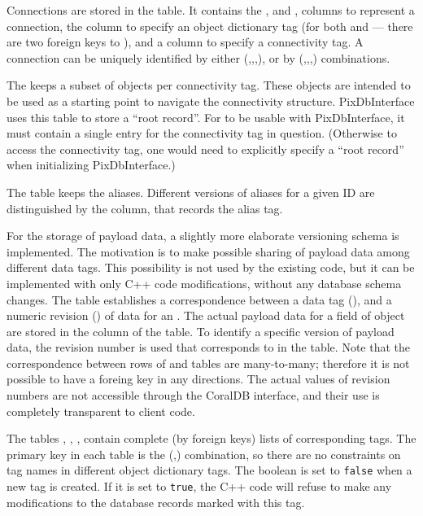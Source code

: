 Connections are stored in the  table.  It
contains the , and , columns
to represent a connection, the  column to specify an object
dictionary tag (for both  and  --- there are two
foreign keys to ), and a  column to
specify a connectivity tag.  A connection can be uniquely identified
by either (,,,), or by
(,,,) combinations.

The  keeps a subset of objects per
connectivity tag.  These objects are intended to be used as a starting
point to navigate the connectivity structure.  PixDbInterface uses
this table to store a ``root record''.  For 
to be usable with PixDbInterface, it must contain a single entry for
the connectivity tag in question.  (Otherwise to access the
connectivity tag, one would need to explicitly specify a ``root
record'' when initializing PixDbInterface.)

The  table keeps the aliases.  Different
versions of aliases for a given ID are distinguished by the 
column, that records the alias tag.

For the storage of payload data, a slightly more elaborate versioning
schema is implemented.  The motivation is to make possible sharing of
payload data among different data tags.  This possibility is not used
by the existing code, but it can be implemented with only C++ code
modifications, without any database schema changes.  The table
 establishes a correspondence between a
data tag (), and a numeric revision () of data for
an .  The actual payload data for a field  of
object  are stored in the  column of the
 table.  To identify a specific version of
payload data, the revision number  is used that corresponds
to  in the  table.  Note that the
correspondence between rows of  and
 tables are many-to-many; therefore it is
not possible to have a foreing key in any directions.  The actual
values of revision numbers are not accessible through the CoralDB
interface, and their use is completely transparent to client code.

The tables ,
, , contain
complete (by foreign keys) lists of corresponding tags.  The primary
key in each table is the (,) combination, so there
are no constraints on tag names in different object dictionary tags.
The  boolean is set to \texttt{false} when a new tag is
created.  If it is set to \texttt{true}, the C++ code will refuse to
make any modifications to the database records marked with this tag.

